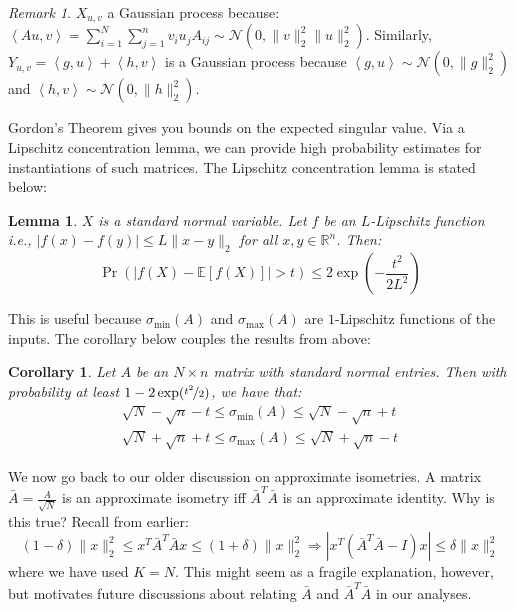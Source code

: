 \documentclass{article}
\newtheorem{corollary}{Corollary}[subsection]
\newtheorem{lemma}{Lemma}[subsection]
\theoremstyle{remark}
\newtheorem*{remark}{Remark}
\newcommand{\real}{\mathbb{R}}
\newcommand{\Exp}{\mathbb{E}}
\newcommand{\inner}[2]{\left\langle #1, #2 \right\rangle}
\newcommand{\calN}{\mathcal{N}}
\begin{document}
\begin{remark}
\(X_{u, v}\) a Gaussian process because: \(\inner{Au}{v} = \sum\limits_{i=1}^{N}\sum\limits_{j=1}^{n}v_{i}u_{j}A_{ij} \sim \calN\left(0, \|v\|_{2}^{2}\|u\|_{2}^{2}\right)\). Similarly, \(Y_{u,v} = \inner{g}{u} + \inner{h}{v}\) is a Gaussian process because \(\inner{g}{u} \sim \calN(0, \|g\|_{2}^{2})\) and \(\inner{h}{v} \sim \calN(0, \|h\|_{2}^{2})\).
\end{remark}

Gordon's Theorem gives you bounds on the expected singular value. Via a Lipschitz concentration lemma, we can provide high probability estimates for instantiations of such matrices. The Lipschitz concentration lemma is stated below:
\begin{lemma}
\(X\) is a standard normal variable. Let \(f\) be an \(L\)-Lipschitz function i.e., \(|f(x) - f(y)| \leq L\|x - y\|_{2}\) for all \(x, y \in \real^{n}\). Then:
\begin{equation*}
\Pr\left(\left|f(X) - \Exp\left[f(X)\right]\right| > t\right) \leq 2\exp\left(-\frac{t^{2}}{2L^{2}}\right)
\end{equation*}
\end{lemma}

This is useful because \(\sigma_{\min}(A)\) and \(\sigma_{\max}(A)\) are \(1\)-Lipschitz functions of the inputs. The corollary below couples the results from above:
\begin{corollary}
Let \(A\) be an \(N \times n\) matrix with standard normal entries. Then with probability at least \(1 - 2\exp(\nicefrac{t^{2}}{2})\), we have that:
\begin{gather*}
\sqrt{N} - \sqrt{n} - t \leq \sigma_{\min}(A) \leq \sqrt{N} - \sqrt{n} + t \\
\sqrt{N} + \sqrt{n} + t \leq \sigma_{\max}(A) \leq \sqrt{N} + \sqrt{n} - t
\end{gather*}
\end{corollary}

We now go back to our older discussion on approximate isometries. A matrix \(\bar{A} = \frac{A}{\sqrt{N}}\) is an approximate isometry iff \(\bar{A}^{T}\bar{A}\) is an approximate identity. Why is this true? Recall from earlier:
\begin{equation*}
(1 - \delta)\|x\|_{2}^{2} \leq x^{T}\bar{A}^{T}\bar{A}x \leq (1 + \delta)\|x\|_{2}^{2} \Rightarrow |x^{T}(\bar{A}^{T}\bar{A} - I)x| \leq \delta \|x\|_{2}^{2}
\end{equation*}
where we have used \(K = N\). This might seem as a fragile explanation, however, but motivates future discussions about relating \(\bar{A}\) and \(\bar{A}^{T}\bar{A}\) in our analyses.
\end{document}
